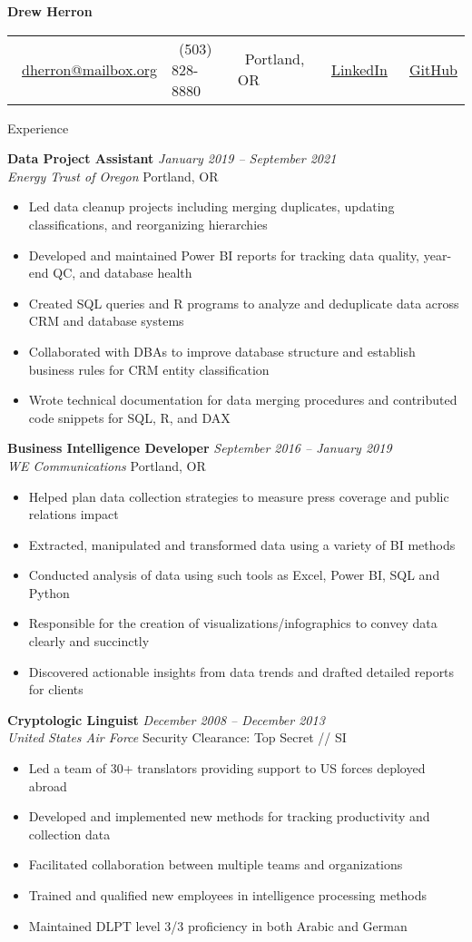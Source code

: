 \documentclass[letterpaper,11pt]{article}
\makeatletter
\newcommand{\contact}[6]{
  \begin{center}
    \begin{tabular*}{\textwidth}{@{\extracolsep{\fill}} l l l l l}
      \faEnvelope\ \href{mailto:#1}{#1} & 
      \faPhone\ #2 & 
      \faMapMarker*\ #3 & 
      \faLinkedin\ \href{#4}{LinkedIn} &
      \faGithub\ \href{#5}{GitHub}
    \end{tabular*}
  \end{center}
}
\newcommand{\entry}[4]{
  \vspace{0.1em}
  \noindent\textbf{#1} \hfill \textit{#2}
  \\ \textit{#3} \hfill #4
  \vspace{0.3em}
}
\newcommand{\achievement}[1]{
  \vspace{-.5em}
  \item #1
}
\makeatother
\begin{document}
\begin{center}
  {\Huge\textbf{Drew Herron}}
\end{center}
  
  \contact
    {dherron@mailbox.org}
    {(503) 828-8880}
    {Portland, OR}
    {https://www.linkedin.com/in/drew-herron}
    {https://github.com/drewherron}

\section{Experience}

\entry{Data Project Assistant}{January 2019 -- September 2021}{Energy Trust of Oregon}{Portland, OR}
\begin{itemize}[leftmargin=*]
  \achievement{Led data cleanup projects including merging duplicates, updating classifications, and reorganizing hierarchies}
  \achievement{Developed and maintained Power BI reports for tracking data quality, year-end QC, and database health}
  \achievement{Created SQL queries and R programs to analyze and deduplicate data across CRM and database systems}
  \achievement{Collaborated with DBAs to improve database structure and establish business rules for CRM entity classification}
  \achievement{Wrote technical documentation for data merging procedures and contributed code snippets for SQL, R, and DAX}
\end{itemize}

\entry{Business Intelligence Developer}{September 2016 -- January 2019}{WE Communications}{Portland, OR}
\begin{itemize}[leftmargin=*]
  \achievement{Helped plan data collection strategies to measure press coverage and public relations impact}
  \achievement{Extracted, manipulated and transformed data using a variety of BI methods}
  \achievement{Conducted analysis of data using such tools as Excel, Power BI, SQL and Python}
  \achievement{Responsible for the creation of visualizations/infographics to convey data clearly and succinctly}
  \achievement{Discovered actionable insights from data trends and drafted detailed reports for clients}
\end{itemize}

\entry{Cryptologic Linguist}{December 2008 -- December 2013}{United States Air Force}{Security Clearance: Top Secret // SI}
\begin{itemize}[leftmargin=*]
  \achievement{Led a team of 30+ translators providing support to US forces deployed abroad}
  \achievement{Developed and implemented new methods for tracking productivity and collection data}
  \achievement{Facilitated collaboration between multiple teams and organizations}
  \achievement{Trained and qualified new employees in intelligence processing methods}
  \achievement{Maintained DLPT level 3/3 proficiency in both Arabic and German}
\end{itemize}
\end{document}
